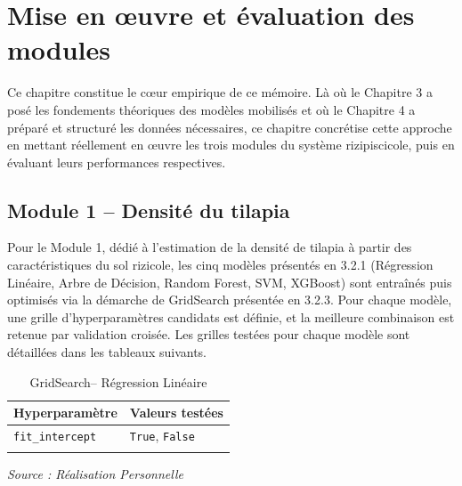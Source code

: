 \documentclass[a4paper,12pt, oneside]{article}
\begin{document}
\section{Mise en œuvre et évaluation des modules}

Ce chapitre constitue le cœur empirique de ce mémoire. Là où le Chapitre 3 a posé les fondements théoriques des modèles mobilisés et où le Chapitre 4 a préparé et structuré les données nécessaires, ce chapitre concrétise cette approche en mettant réellement en œuvre les trois modules du système rizipiscicole, puis en évaluant leurs performances respectives.

\subsection[Densité du tilapia]{Module 1 -- Densité du tilapia\\}

Pour le Module 1, dédié à l'estimation de la densité de tilapia à partir des caractéristiques du sol rizicole, les cinq modèles présentés en 3.2.1 (Régression Linéaire, Arbre de Décision, Random Forest, SVM, XGBoost) sont entraînés puis optimisés via la démarche de GridSearch présentée en 3.2.3. Pour chaque modèle, une grille d'hyperparamètres candidats est définie, et la meilleure combinaison est retenue par validation croisée. Les grilles testées pour chaque modèle sont détaillées dans les tableaux suivants.

\begin{longtable}{|p{5cm}|p{12cm}|}
\hline
\textbf{Hyperparamètre} & \textbf{Valeurs testées} \\
\hline

\texttt{fit\_intercept} & \texttt{True}, \texttt{False} \\
\hline
\caption{GridSearch-- Régression Linéaire} 
\end{longtable}
\begin{center}
\vspace{-0.85cm}
\end{center}
\begin{center}
\vspace{-0.85cm}
\textit{Source : Réalisation Personnelle}
\end{center}
\end{document}
